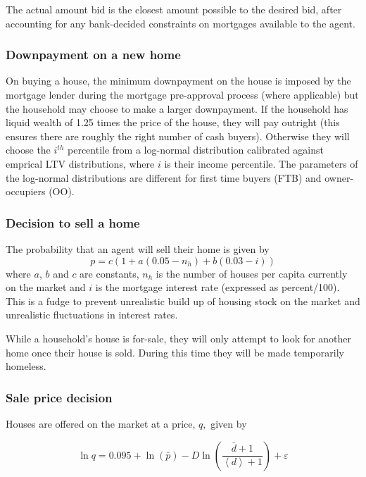 \documentclass{report}
\begin{document}
The actual amount bid is the closest amount possible to the desired bid, after accounting for any bank-decided constraints on mortgages available to the agent.

\subsubsection{Downpayment on a new home}
\label{downpayment}
On buying a house, the minimum downpayment on the house is imposed by the mortgage lender during the mortgage pre-approval process (where applicable) but the household may choose to make a larger downpayment. If the household has liquid wealth of 1.25 times the price of the house, they will pay outright (this ensures there are roughly the right number of cash buyers). Otherwise they will choose the $i^{th}$ percentile from a log-normal distribution calibrated against emprical LTV distributions, where $i$ is their income percentile. The parameters of the log-normal distributions are different for first time buyers (FTB) and owner-occupiers (OO).

\subsubsection{Decision to sell a home}
The probability that an agent will sell their home is given by
\begin{equation}
p = c(1 + a(0.05-n_h) + b(0.03-i))
\label{sellhome}
\end{equation}
where $a$, $b$ and $c$ are constants, $n_h$ is the number of houses per capita currently on the market and $i$ is the mortgage interest rate (expressed as percent/100). This is a fudge to prevent unrealistic build up of housing stock on the market and unrealistic fluctuations in interest rates.

While a household's house is for-sale, they will only attempt to look for another home once their house is sold. During this time they will be made temporarily homeless.

\subsubsection{Sale price decision}
\label{saleprice}
Houses are offered on the market at a price, $q,$ given by

\begin{equation}
\ln q=0.095+\ln (\bar{p})-D\ln \left( \frac{\bar{d}+1}{\left\langle
d\right\rangle +1}\right) +\varepsilon
\end{equation}
\end{document}
